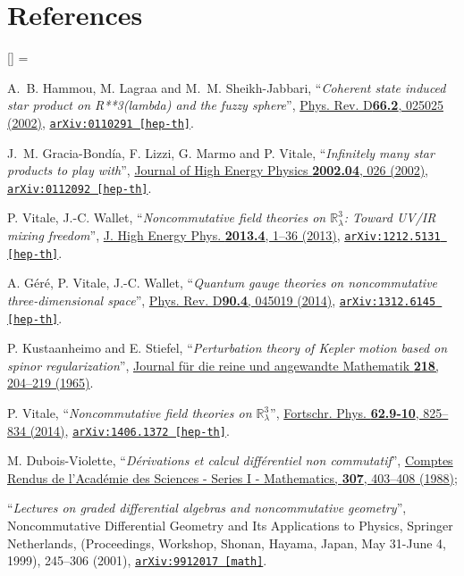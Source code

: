 \documentclass[a4paper,11pt,twoside]{article}
\numberwithin{equation}{section}
\newcommand{\doi}[2]{\href{http://dx.doi.org/#1}{#2}}
\newcommand{\arxiv}[3]{\href{#3}{\texttt{arXiv:#1 [#2]}}}
\theoremstyle{nonumberplain}
\newcounter{and}
\renewenvironment{thebibliography}[1]{%
\section*{References}%
\frenchspacing\small%
\begin{list}{[\arabic{enumi}]}%
{%
\usecounter{enumi}\parsep=2pt\topsep 0pt%
\settowidth{\labelwidth}{[#1]}%
\leftmargin=\labelwidth\advance\leftmargin\labelsep%
\rightmargin=0pt\itemsep=1pt\sloppy%
}%
}{\end{list}}
\begin{document}
\begin{thebibliography}{88}
% 
A.~B. Hammou, M. Lagraa and M.~M. Sheikh-Jabbari, %
``\emph{Coherent state induced star product on R**3(lambda) and the fuzzy sphere}'', %
\doi{10.1103/PhysRevD.66.025025}{Phys. Rev. D\textbf{66.2}, 025025 (2002)}, %
\arxiv{0110291}{hep-th}{http://arxiv.org/abs/hep-th/0110291}.%

%
J.~M. Gracia-Bond\'ia, F. Lizzi, G. Marmo and P. Vitale, %
``\emph{Infinitely many star products to play with}'', %
\doi{1126-6708/2002/04/026/}{Journal of High Energy Physics \textbf{2002.04}, 026 (2002)}, %
\arxiv{0112092}{hep-th}{http://arxiv.org/abs/hep-th/0112092}.%

% 
P. Vitale, J.-C. Wallet, %
``\emph{Noncommutative field theories on $\mathbb{R}^3_\lambda$: Toward UV/IR mixing freedom}'', %
\doi{10.1007/JHEP04(2013)115}{J. High Energy Phys. \textbf{2013.4}, 1--36 (2013)}, %
\arxiv{1212.5131}{hep-th}{http://arxiv.org/abs/1212.5131}.%

% 
A. G\'er\'e, P. Vitale, J.-C. Wallet,%
``\emph{Quantum gauge theories on noncommutative three-dimensional space}'', %
\doi{10.1103/PhysRevD.90.045019}{Phys. Rev. D\textbf{90.4}, 045019 (2014)}, %
\arxiv{1312.6145}{hep-th}{http://arxiv.org/abs/1312.6145}.%

%
P. Kustaanheimo and E. Stiefel, %
``\emph{Perturbation theory of Kepler motion based on spinor regularization}'', %
\href{http://gdz.sub.uni-goettingen.de/dms/resolveppn/?PPN=GDZPPN00218124X}{Journal f\"ur die reine und angewandte Mathematik \textbf{218}, 204--219 (1965)}.%

% 
P. Vitale, %
``\emph{Noncommutative field theories on $\mathbb{R}^3_\lambda$}'', %
\doi{10.1002/prop.201400037}{Fortschr. Phys. \textbf{62.9‐10}, 825--834 (2014)}, %
\arxiv{1406.1372}{hep-th}{http://arxiv.org/abs/1406.1372}.%

%
M. Dubois-Violette, %
``\emph{Dérivations et calcul différentiel non commutatif}'', %
\href{http://patriciadv.free.fr/MDV/Publications_files/88-19.pdf}{Comptes Rendus de l'Académie des Sciences - Series I - Mathematics, \textbf{307}, 403--408 (1988)};\par%
``\emph{Lectures on graded differential algebras and noncommutative geometry}'', %
Noncommutative Differential Geometry and Its Applications to Physics, Springer Netherlands, (Proceedings, Workshop, Shonan, Hayama, Japan, May 31-June 4, 1999), 245--306 (2001), %
\arxiv{9912017}{math}{http://arxiv.org/abs/math/9912017}.%


\end{thebibliography}
\end{document}
